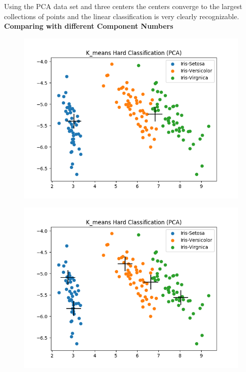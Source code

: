 \documentclass[a4paper]{article}
\begin{document}
\noindent
Using the PCA data set and three centers the centers converge to the largest collections of points and the linear classification is very clearly recognizable. \\

\noindent
{\large \textbf{Comparing with different Component Numbers}} \\


\begin{figure}[htp]
\centering
\begin{minipage}{0.4\textwidth}
  \includegraphics[scale=0.5]{plots/kmeans_sc3_c2.png}
  \label{fig:16}
\end{minipage}
\hfill
\begin{minipage}{0.4\textwidth}
  \includegraphics[scale=0.5]{plots/kmeans_sc3_c5.png}
  \label{fig:17}
\end{minipage}
\end{figure}
\end{document}

